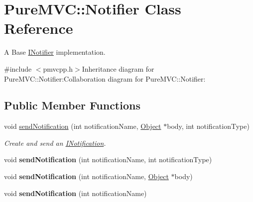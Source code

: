 \hypertarget{class_pure_m_v_c_1_1_notifier}{
\section{PureMVC::Notifier Class Reference}
\label{class_pure_m_v_c_1_1_notifier}
}


A Base {\ttfamily \hyperlink{class_pure_m_v_c_1_1_i_notifier}{INotifier}} implementation.  


{\ttfamily \#include $<$pmvcpp.h$>$}Inheritance diagram for PureMVC::Notifier:Collaboration diagram for PureMVC::Notifier:\subsection*{Public Member Functions}
\begin{DoxyCompactItemize}
\item 
void \hyperlink{class_pure_m_v_c_1_1_notifier_a55a358ee2661ecc08400653016fdb497}{sendNotification} (int notificationName, \hyperlink{class_pure_m_v_c_1_1_object}{Object} $\ast$body, int notificationType)
\begin{DoxyCompactList}\small\item\em Create and send an {\ttfamily \hyperlink{class_pure_m_v_c_1_1_i_notification}{INotification}}. \item\end{DoxyCompactList}\item 
\hypertarget{class_pure_m_v_c_1_1_notifier_a6fa2ef42750287b410dcdd867479450b}{
void {\bfseries sendNotification} (int notificationName, int notificationType)}
\label{class_pure_m_v_c_1_1_notifier_a6fa2ef42750287b410dcdd867479450b}

\item 
\hypertarget{class_pure_m_v_c_1_1_notifier_a79a17268f222d42c1cc1f41a13da3b62}{
void {\bfseries sendNotification} (int notificationName, \hyperlink{class_pure_m_v_c_1_1_object}{Object} $\ast$body)}
\label{class_pure_m_v_c_1_1_notifier_a79a17268f222d42c1cc1f41a13da3b62}

\item 
\hypertarget{class_pure_m_v_c_1_1_notifier_a012642026e913c8e30d006e2e8f869c6}{
void {\bfseries sendNotification} (int notificationName)}
\label{class_pure_m_v_c_1_1_notifier_a012642026e913c8e30d006e2e8f869c6}


\end{DoxyCompactItemize}
